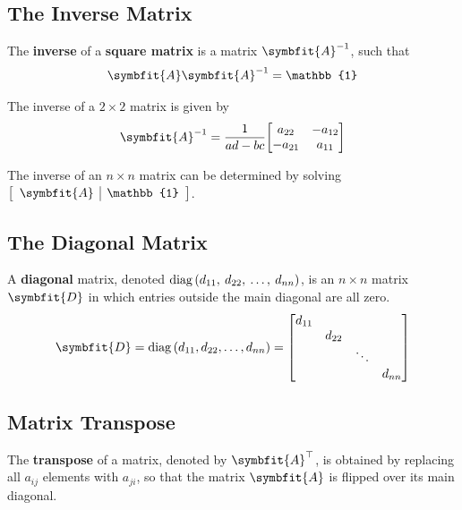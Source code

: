 \documentclass{article}
\begin{document}
	\subsection{The Inverse Matrix}
	\begin{definition}
		The \textbf{inverse} of a \textbf{square matrix} is a matrix $\symbfit{A}^{-1}$, such that
		\begin{equation*}
			\symbfit{A} \symbfit{A}^{-1} = \mathbb{1}
		\end{equation*}
	\end{definition}
	\begin{theorem}
		The inverse of a $2\times 2$ matrix is given by
		\begin{equation*}
			\symbfit{A}^{-1} = \frac{1}{ad-bc}
			\mqty[
				a_{22}  & -a_{12} \\
				-a_{21} & a_{11}
			]
		\end{equation*}
	\end{theorem}
	\begin{theorem}
		The inverse of an $n\times n$ matrix can be determined by solving $\left[\begin{array}{c|c} \symbfit{A} & \mathbb{1} \end{array}\right]$.
	\end{theorem}
	\subsection{The Diagonal Matrix}
	\begin{definition}
		A \textbf{diagonal} matrix, denoted $\operatorname{diag}{\left( d_{11},\: d_{22},\: \ldots,\: d_{nn} \right)}$, is an $n \times n$ matrix $\symbfit{D}$ in which entries outside the main diagonal are all zero. 
		\begin{equation*}
			\symbfit{D} = \diag{\left( d_{11}, d_{22}, \ldots, d_{nn} \right)}
			=\mqty[
				d_{11} &        &        & \\
				       & d_{22} &        & \\
					   &        & \ddots & \\
					   &        &        & d_{nn}
			]
		\end{equation*}
	\end{definition}
	\subsection{Matrix Transpose}
	\begin{definition}
		The \textbf{transpose} of a matrix, denoted by $\symbfit{A}^\top$, is obtained by replacing all $a_{ij}$ elements with $a_{ji}$, so that the matrix $\symbfit{A}$ is flipped over its main diagonal.
	\end{definition}
\end{document}
